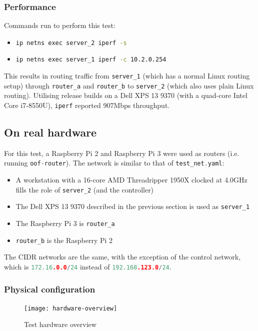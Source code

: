 \documentclass[a4paper]{article}
\numberwithin{figure}{section}
\numberwithin{table}{section}
\newcommand{\mi}{\mintinline}
\begin{document}
\subsubsection{Performance}
Commands run to perform this test:
\begin{itemize}
	\item \mi{bash}{ip netns exec server_2 iperf -s}
	\item \mi{bash}{ip netns exec server_1 iperf -c 10.2.0.254}
\end{itemize}

This results in routing traffic from \mi{c}{server_1} (which has a normal Linux routing setup) through \mi{c}{router_a} and \mi{c}{router_b} to \mi{c}{server_2} (which also uses plain Linux routing). Utilising release builds on a Dell XPS 13 9370 (with a quad-core Intel Core i7-8550U), \mi{c}{iperf} reported 907Mbps throughput.

\subsection{On real hardware}
For this test, a Raspberry Pi 2 and Raspberry Pi 3 were used as routers (i.e. running \mi{c}{oof-router}). The network is similar to that of \mi{c}{test_net.yaml}:
\begin{itemize}
	\item A workstation with a 16-core AMD Threadripper 1950X clocked at 4.0GHz fills the role of \mi{c}{server_2} (and the controller)
	\item The Dell XPS 13 9370 described in the previous section is used as \mi{c}{server_1}
	\item The Raspberry Pi 3 is \mi{c}{router_a}
	\item \mi{c}{router_b} is the Raspberry Pi 2
\end{itemize}

The CIDR networks are the same, with the exception of the control network, which is \mi{c}{172.16.0.0/24} instead of \mi{c}{192.168.123.0/24}.

\subsubsection{Physical configuration}
\begin{figure}[h!]
	\centering
	\texttt{[image: hardware-overview]}
	\caption{Test hardware overview}
	\label{fig:hardware-overview}
\end{figure}
\end{document}
